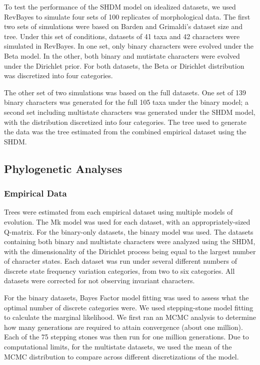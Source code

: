 \documentclass[]{sysbio}
\begin{document}
To test the performance of the SHDM model on idealized datasets, we used RevBayes to simulate four sets of 100 replicates of morphological data.
The first two sets of simulations were based on Barden and Grimaldi's dataset size and tree.
Under this set of conditions, datasets of 41 taxa and 42 characters were simulated in RevBayes.
In one set, only binary characters were evolved under the Beta model.
In the other, both binary and mutistate characters were evolved under the Dirichlet prior.
For both datasets, the Beta or Dirichlet distribution was discretized into four categories.
\par
The other set of two simulations was based on the full datasets.
One set of 139 binary characters was generated for the full 105 taxa under the binary model; a second set including multistate characters was generated under the SHDM model, with the distribution discretized into four categories.
The tree used to generate the data was the tree estimated from the combined empirical dataset using the SHDM. \par

\subsection{Phylogenetic Analyses}
\subsubsection{Empirical Data}

Trees were estimated from each empirical dataset using multiple models of evolution.
The Mk model was used for each dataset, with an appropriately-sized Q-matrix.
For the binary-only datasets, the binary model was used.
The datasets containing both binary and multistate characters were analyzed using the SHDM, with the dimensionality of the Dirichlet process being equal to the largest number of character states. 
Each dataset was run under several different numbers of discrete state frequency variation categories, from two to six categories.
All datasets were corrected for not observing invariant characters. \par
For the binary datasets, Bayes Factor model fitting was used to assess what the optimal number of discrete categories were.
We used stepping-stone model fitting to calculate the marginal likelihood.
We first ran an MCMC analysis to determine how many generations are required to attain convergence (about one million).
Each of the 75 stepping stones was then run for one million generations.
Due to computational limits, for the multistate datasets, we used the mean of the MCMC distribution to compare across different discretizations of the model. \par
\end{document}
